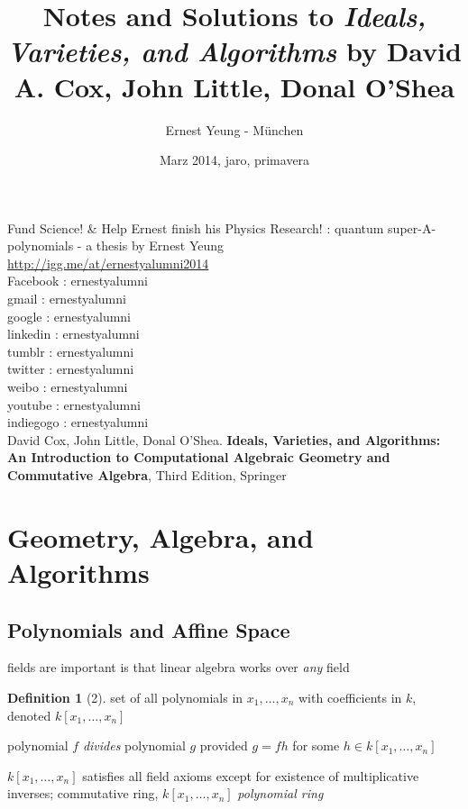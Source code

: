\documentclass[twoside]{amsart}
\title{Notes and Solutions to \emph{Ideals, Varieties, and Algorithms} by David A. Cox, John Little, Donal O'Shea  }
\author{
  Ernest Yeung - M\"{u}nchen
       }
\date{Marz 2014, jaro, primavera}
\theoremstyle{plain}
\theoremstyle{definition}
\newtheorem{definition}{Definition}
\begin{document}

\maketitle

Fund Science! \& Help Ernest finish his Physics Research! : quantum super-A-polynomials - a thesis by Ernest Yeung \\

\url{http://igg.me/at/ernestyalumni2014} \\

\noindent Facebook  : ernestyalumni \\
gmail        : ernestyalumni \\
google       : ernestyalumni \\
linkedin     : ernestyalumni \\
tumblr       : ernestyalumni \\
twitter      : ernestyalumni \\
weibo        : ernestyalumni \\ 
youtube      : ernestyalumni \\
indiegogo    : ernestyalumni \\

David Cox, John Little, Donal O'Shea. \textbf{Ideals, Varieties, and Algorithms: An Introduction to Computational Algebraic Geometry and Commutative Algebra}, Third Edition, Springer

\section{Geometry, Algebra, and Algorithms}

\subsection{Polynomials and Affine Space}

fields are important is that linear algebra works over \emph{any} field

\begin{definition}[2] set of all polynomials in $x_1 , \dots , x_n$ with coefficients in $k$, denoted $k[x_1, \dots , x_n]$

\end{definition}

polynomial $f$ \emph{divides} polynomial $g$ provided $g= fh$ for some $h \in k[x_1, \dots , x_n ]$

$k[x_1, \dots, x_n]$ satisfies all field axioms except for existence of multiplicative inverses; commutative ring, $k[x_1, \dots , x_n]$ \emph{polynomial ring}
\end{document}
